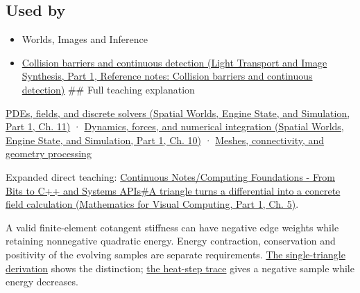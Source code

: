 \subsection{Used by}\label{appendix-1988d465c119-used-by}

\hypertarget{appendix-1988d465c119-used-by}{}

\begin{itemize}
\item
  {Worlds, Images and Inference}
\item
  \href{../04-Light-Transport-and-Image-Synthesis-P01/main.pdf\#appendix-a9ba01fa72a6}{Collision barriers and continuous detection (Light Transport and Image Synthesis, Part 1, Reference notes: Collision barriers and continuous detection)} \#\# Full teaching explanation
\end{itemize}

\href{../05-Spatial-Worlds-Engine-State-and-Simulation-P01/main.pdf\#04-visual-computing-ii-ch030-pdes-fields-and-discrete-solvers}{PDEs, fields, and discrete solvers (Spatial Worlds, Engine State, and Simulation, Part 1, Ch. 11)} · \href{../05-Spatial-Worlds-Engine-State-and-Simulation-P01/main.pdf\#04-visual-computing-ii-ch029-dynamics-forces-and-numerical-integration}{Dynamics, forces, and numerical integration (Spatial Worlds, Engine State, and Simulation, Part 1, Ch. 10)} · \hyperref[03-visual-computing-i-ch002-meshes-connectivity-and-geometry-processing]{Meshes, connectivity, and geometry processing}

Expanded direct teaching: \href{../02-Mathematics-for-Visual-Computing-P01/main.pdf\#02-foundations-ii-ch021-a-triangle-turns-a-differential-into-a-concrete-field-calculation}{Continuous Notes/Computing Foundations - From Bits to C++ and Systems APIs\#A triangle turns a differential into a concrete field calculation (Mathematics for Visual Computing, Part 1, Ch. 5)}.

A valid finite-element cotangent stiffness can have negative edge weights while retaining nonnegative quadratic energy. Energy contraction, conservation and positivity of the evolving samples are separate requirements. \hyperref[03-visual-computing-i-ch002-nonnegative-energy-and-nonnegative-weights-are-different-promises]{The single-triangle derivation} shows the distinction; \hyperref[03-visual-computing-i-ch002-a-stable-heat-step-can-still-create-a-negative-sample]{the heat-step trace} gives a negative sample while energy decreases.
